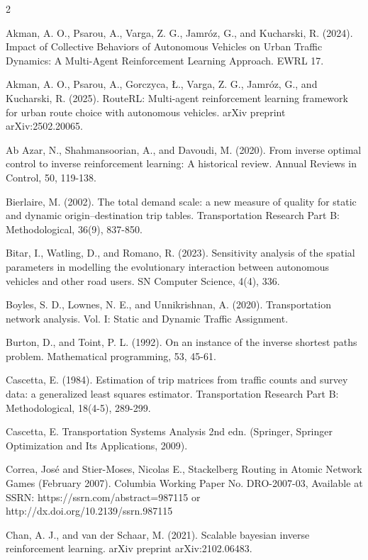 \documentclass[a4paper,11pt]{article}
\renewcommand{\footnotesize}{\fontsize{8bp}{1em}\selectfont}
\begin{document}
\begin{thebibliography}{2}
\footnotesize


 Akman, A. O., Psarou, A., Varga, Z. G., Jamróz, G., and Kucharski, R. (2024). Impact of Collective Behaviors of Autonomous Vehicles on Urban Traffic Dynamics: A Multi-Agent Reinforcement Learning Approach. EWRL 17.

 Akman, A. O., Psarou, A., Gorczyca, Ł., Varga, Z. G., Jamróz, G., and Kucharski, R. (2025). RouteRL: Multi-agent reinforcement learning framework for urban route choice with autonomous vehicles. arXiv preprint arXiv:2502.20065.

 Ab Azar, N., Shahmansoorian, A., and Davoudi, M. (2020). From inverse optimal control to inverse reinforcement learning: A historical review. Annual Reviews in Control, 50, 119-138.

 Bierlaire, M. (2002). The total demand scale: a new measure of quality for static and dynamic origin–destination trip tables. Transportation Research Part B: Methodological, 36(9), 837-850.

 Bitar, I., Watling, D., and Romano, R. (2023). Sensitivity analysis of the spatial parameters in modelling the evolutionary interaction between autonomous vehicles and other road users. SN Computer Science, 4(4), 336.

 Boyles, S. D., Lownes, N. E., and Unnikrishnan, A. (2020). Transportation network analysis. Vol. I: Static and Dynamic Traffic Assignment.

 Burton, D., and Toint, P. L. (1992). On an instance of the inverse shortest paths problem. Mathematical programming, 53, 45-61.

 Cascetta, E. (1984). Estimation of trip matrices from traffic counts and survey data: a generalized least squares estimator. Transportation Research Part B: Methodological, 18(4-5), 289-299.

 Cascetta, E. Transportation Systems Analysis 2nd edn. (Springer, Springer Optimization and Its Applications, 2009).

 Correa, José and Stier-Moses, Nicolas E., Stackelberg Routing in Atomic Network Games (February 2007). Columbia Working Paper No. DRO-2007-03, Available at SSRN: https://ssrn.com/abstract=987115 or http://dx.doi.org/10.2139/ssrn.987115

 Chan, A. J., and van der Schaar, M. (2021). Scalable bayesian inverse reinforcement learning. arXiv preprint arXiv:2102.06483.


\end{thebibliography}
\end{document}
